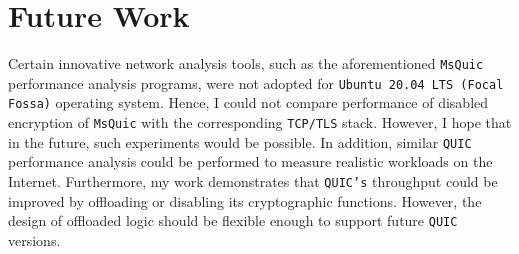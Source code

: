\documentclass[12pt,a4paper]{report}
\begin{document}
\section{Future Work}

Certain innovative network analysis tools, such as the aforementioned \texttt{MsQuic} performance analysis programs, were not adopted for \texttt{Ubuntu 20.04 LTS (Focal Fossa)} operating system.
Hence, I could not compare performance of disabled encryption of \texttt{MsQuic} with the corresponding \texttt{TCP/TLS} stack.
However, I hope that in the future, such experiments would be possible.
In addition, similar \texttt{QUIC} performance analysis could be performed to measure realistic workloads on the Internet.
Furthermore, my work demonstrates that \texttt{QUIC's} throughput could be improved by offloading or disabling its cryptographic functions.
However, the design of offloaded logic should be flexible enough to support future \texttt{QUIC} versions.



\appendix
\end{document}
